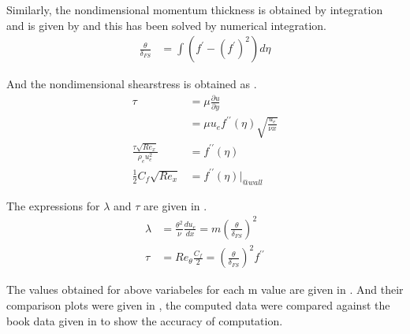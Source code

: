 \par Similarly, the nondimensional momentum thickness is obtained by integration
and is given by  and this has been solved by numerical integration.
\begin{align}
    \frac{\theta}{\delta_{FS}} &= \int{}{}\left(f^{\prime} - \left(f^\prime\right)^2\right)d\eta \label{theta_dFS}
\end{align}

\par And the nondimensional shearstress is obtained as .
\begin{align}
    \tau &= \mu \frac{\partial u}{\partial y} \nonumber \\
    &= \mu u_e f^{\prime\prime}(\eta) \sqrt{\frac{u_e}{\nu x}} \nonumber \\
    \frac{\tau \sqrt{Re_x}}{\rho_e u_e^2} &= f^{\prime\prime}(\eta) \nonumber \\
    \frac{1}{2}C_f \sqrt{Re_x} &= f^{\prime\prime}(\eta)|_{@wall} \label{Rex_Cf}
\end{align}

\par The expressions for $\lambda$ and $\tau$ are given in .
\begin{align}
    \lambda &= \frac{\theta^2}{\nu} \frac{d u_e}{dx} = m \left(\frac{\theta}{\delta_{FS}}\right)^2 \label{lambda} \\
    \tau &= Re_{\theta}\frac{C_f}{2} = \left(\frac{\theta}{\delta_{FS}}\right)^2 f^{\prime\prime} \label{Tau}
\end{align}

\par The values obtained for above variabeles for each m value are given in . And
their comparison plots were given in , the computed data
were compared against the book data given in \cite{ref_2} to show the
accuracy of computation.

